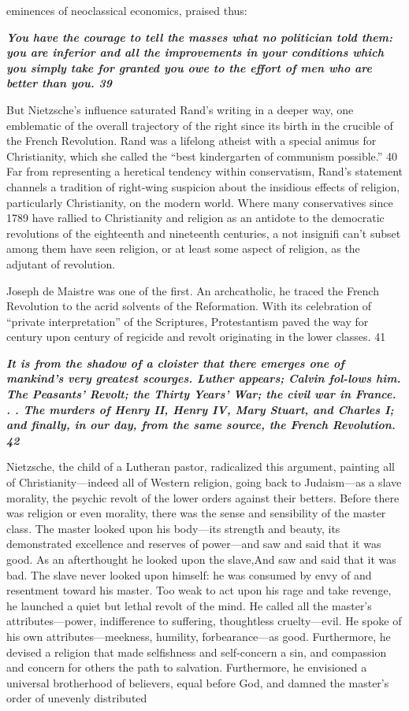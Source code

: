 eminences of neoclassical economics, praised thus:{\par} {\textbf{\textit{You have the courage to tell the masses what no politician told them: you are inferior and all the improvements in your conditions which you simply take for granted you owe to the effort of men who are better than you. {\color{blue} 39 } } } }{\par} But Nietzsche’s influence saturated Rand’s writing in a deeper way, one emblematic of the overall trajectory of the right since its birth in the crucible of the French Revolution. Rand was a lifelong atheist with a special animus for Christianity, which she called the “best kindergarten of communism possible.” {\color{blue} 40 } Far from representing a heretical tendency within conservatism, Rand’s statement channels a tradition of right-wing suspicion about the insidious effects of religion, particularly Christianity, on the modern world. Where many conservatives since 1789 have rallied to Christianity and religion as an antidote to the democratic revolutions of the eighteenth and nineteenth centuries, a not insignifi can't subset among them have seen religion, or at least some aspect of religion, as the adjutant of revolution.{\par} Joseph de Maistre was one of the first. An archcatholic, he traced the French Revolution to the acrid solvents of the Reformation. With its celebration of “private interpretation” of the Scriptures, Protestantism paved the way for century upon century of regicide and revolt originating in the lower classes. 41{\par} {\textbf{\textit{It is from the shadow of a cloister that there emerges one of mankind’s very greatest scourges. Luther appears; Calvin fol-lows him. The Peasants’ Revolt; the Thirty Years’ War; the civil war in France. . . The murders of Henry II, Henry IV, Mary Stuart, and Charles I; and finally, in our day, from the same source, the French Revolution. {\color{blue} 42 } } } }{\par} Nietzsche, the child of a Lutheran pastor, radicalized this argument, painting all of Christianity—indeed all of Western religion, going back to Judaism—as a slave morality, the psychic revolt of the lower orders against their betters. Before there was religion or even morality, there was the sense and sensibility of the master class. The master looked upon his body—its strength and beauty, its demonstrated excellence and reserves of power—and saw and said that it was good. As an afterthought he looked upon the slave,And saw and said that it was bad. The slave never looked upon himself: he was consumed by envy of and resentment toward his master. Too weak to act upon his rage and take revenge, he launched a quiet but lethal revolt of the mind. He called all the master’s attributes—power, indifference to suffering, thoughtless cruelty—evil. He spoke of his own attributes—meekness, humility, forbearance—as good. Furthermore, he devised a religion that made selfishness and self-concern a sin, and compassion and concern for others the path to salvation. Furthermore, he envisioned a universal brotherhood of believers, equal before God, and damned the master’s order of unevenly distributed 